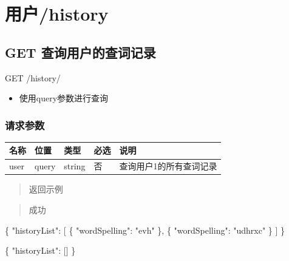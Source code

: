 \documentclass[
]{article}
\newenvironment{Shaded}{}{}
\newcommand{\DataTypeTok}[1]{\textcolor[rgb]{0.56,0.13,0.00}{#1}}
\newcommand{\FunctionTok}[1]{\textcolor[rgb]{0.02,0.16,0.49}{#1}}
\newcommand{\OtherTok}[1]{\textcolor[rgb]{0.00,0.44,0.13}{#1}}
\newcommand{\StringTok}[1]{\textcolor[rgb]{0.25,0.44,0.63}{#1}}
\begin{document}
\hypertarget{ux7528ux6237history}{%
\section{用户/history}\label{ux7528ux6237history}}

\hypertarget{get-ux67e5ux8be2ux7528ux6237ux7684ux67e5ux8bcdux8bb0ux5f55}{%
\subsection{GET
查询用户的查词记录}\label{get-ux67e5ux8be2ux7528ux6237ux7684ux67e5ux8bcdux8bb0ux5f55}}

GET /history/

\begin{itemize}
\item
  使用query参数进行查询
\end{itemize}

\hypertarget{ux8bf7ux6c42ux53c2ux6570-33}{%
\subsubsection{请求参数}\label{ux8bf7ux6c42ux53c2ux6570-33}}

\begin{longtable}[]{@{}lllll@{}}
\toprule
名称 & 位置 & 类型 & 必选 & 说明 \\
\midrule
\endhead
user & query & string & 否 & 查询用户1的所有查词记录 \\
\bottomrule
\end{longtable}

\begin{quote}
返回示例
\end{quote}

\begin{quote}
成功
\end{quote}

\begin{Shaded}
\begin{Highlighting}[]
\FunctionTok{\{}
  \DataTypeTok{"historyList"}\FunctionTok{:} \OtherTok{[}
    \FunctionTok{\{}
      \DataTypeTok{"wordSpelling"}\FunctionTok{:} \StringTok{"evh"}
    \FunctionTok{\}}\OtherTok{,}
    \FunctionTok{\{}
      \DataTypeTok{"wordSpelling"}\FunctionTok{:} \StringTok{"udhrxc"}
    \FunctionTok{\}}
  \OtherTok{]}
\FunctionTok{\}}
\end{Highlighting}
\end{Shaded}

\begin{Shaded}
\begin{Highlighting}[]
\FunctionTok{\{}
  \DataTypeTok{"historyList"}\FunctionTok{:} \OtherTok{[]}
\FunctionTok{\}}
\end{Highlighting}
\end{Shaded}
\end{document}
